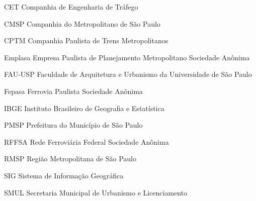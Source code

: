\documentclass[
	12pt,				%
	openright,			%
	oneside,
	a4paper,			%
	english,			%
	french,				%
	spanish,			%
	brazil,				%
	]{abntex2}
\begin{document}

\frenchspacing 


\imprimircapa

\imprimirfolhaderosto



\listoftables*
\cleardoublepage

\begin{siglas}
	\item[CET] Companhia de Engenharia de Tráfego
	\item[CMSP] Companhia do Metropolitano de São Paulo
	\item[CPTM] Companhia Paulista de Trens Metropolitanos
	\item[Emplasa] Empresa Paulista de Planejamento Metropolitano Sociedade Anônima
	\item[FAU-USP] Faculdade de Arquitetura e Urbanismo da Universidade de São Paulo
	\item[Fepasa] Ferrovia Paulista Sociedade Anônima
	\item[IBGE] Instituto Brasileiro de Geografia e Estatística
	\item[PMSP] Prefeitura do Município de São Paulo
	\item[RFFSA] Rede Ferroviária Federal Sociedade Anônima
	\item[RMSP] Região Metropolitana de São Paulo
	\item[SIG] Sistema de Informação Geográfica
	\item[SMUL] Secretaria Municipal de Urbanismo e Licenciamento
\end{siglas}

\end{document}
